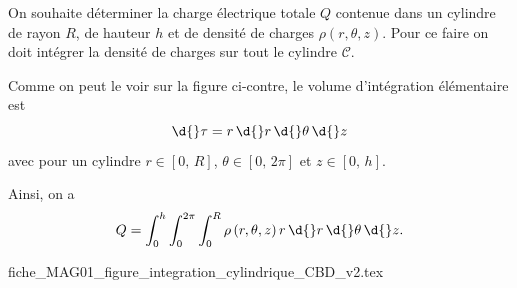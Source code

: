 \hauteurLargeurCadreReponse		{7mm}{8cm}
\typeEntrainement				{} %
\initialisationEntrainement

                                \initialisationPartieGauche %
On souhaite déterminer la charge électrique totale $Q$ contenue dans un cylindre de rayon $R$, de hauteur $h$ et de densité de charges $\rho\left(r,\theta,z\right)$. 
Pour ce faire on doit intégrer la densité de charges sur tout le cylindre $\mathcal{C}$. 

Comme on peut le voir sur la figure ci-contre, le volume d'intégration élémentaire est 
\[
\d{}\tau=r \, \d{}r \, \d{} \theta \, \d{} z
\]
avec pour un cylindre $r \in \left[ 0,\,R\right]$, $\theta \in \left[ 0,\,2\pi\right]$ et $z \in \left[ 0,\,h\right]$. 

Ainsi, on a \vspace{-1.5mm}
\[
Q = \int_{0}^{h} \int_{0}^{2\pi} \int_{0}^{R} \rho\left(r,\theta,z\right) r \, \d{}r \, \d{} \theta \, \d{} z.
\]


                                \initialisationPartieDroite %
\begin{center}
	{fiche_MAG01_figure_integration_cylindrique_CBD_v2.tex}
\end{center}
                               \finalisationDuPartageDePage %


